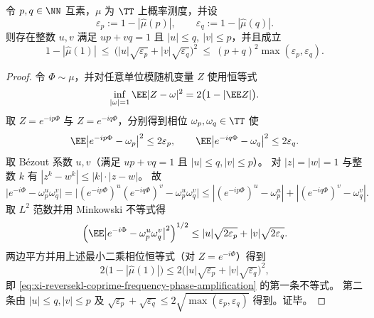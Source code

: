 \begin{proposition}\label{prop:xi-reversekl-coprime-frequency-phase-amplification}
令 \(p,q\in\NN\) 互素，\(\mu\) 为 \(\TT\) 上概率测度，并设
\[
\varepsilon_p:=1-|\widehat\mu(p)|,\qquad \varepsilon_q:=1-|\widehat\mu(q)|.
\]
则存在整数 \(u,v\) 满足 \(up+vq=1\) 且 \(|u|\le q,\ |v|\le p\)，并且成立
\begin{equation}\label{eq:xi-reversekl-coprime-frequency-phase-amplification}
\boxed{\;
1-|\widehat\mu(1)|
\ \le\
\bigl(|u|\sqrt{\varepsilon_p}+|v|\sqrt{\varepsilon_q}\bigr)^2
\ \le\
(p+q)^2\max(\varepsilon_p,\varepsilon_q).\;}
\end{equation}
\end{proposition}
\begin{proof}
令 \(\Phi\sim\mu\)，并对任意单位模随机变量 \(Z\) 使用恒等式
\[
\inf_{|\omega|=1}\EE|Z-\omega|^2
=2\bigl(1-|\EE Z|\bigr).
\]
取 \(Z=e^{-ip\Phi}\) 与 \(Z=e^{-iq\Phi}\)，分别得到相位 \(\omega_p,\omega_q\in\TT\) 使
\[
\EE\bigl|e^{-ip\Phi}-\omega_p\bigr|^2\le 2\varepsilon_p,\qquad
\EE\bigl|e^{-iq\Phi}-\omega_q\bigr|^2\le 2\varepsilon_q.
\]
取 Bézout 系数 \(u,v\)（满足 \(up+vq=1\) 且 \(|u|\le q,|v|\le p\)）。
对 \(|z|=|w|=1\) 与整数 \(k\) 有
\(
|z^k-w^k|\le |k|\cdot |z-w|
\)。
故
\[
\bigl|e^{-i\Phi}-\omega_p^{u}\omega_q^{v}\bigr|
=\bigl|(e^{-ip\Phi})^{u}(e^{-iq\Phi})^{v}-\omega_p^{u}\omega_q^{v}\bigr|
\le |(e^{-ip\Phi})^{u}-\omega_p^{u}|+|(e^{-iq\Phi})^{v}-\omega_q^{v}|.
\]
取 \(L^2\) 范数并用 Minkowski 不等式得
\[
\Bigl(\EE\bigl|e^{-i\Phi}-\omega_p^{u}\omega_q^{v}\bigr|^2\Bigr)^{1/2}
\le |u|\sqrt{2\varepsilon_p}+|v|\sqrt{2\varepsilon_q}.
\]
两边平方并用上述最小二乘相位恒等式（对 \(Z=e^{-i\Phi}\)）得到
\[
2\bigl(1-|\widehat\mu(1)|\bigr)
\le 2\bigl(|u|\sqrt{\varepsilon_p}+|v|\sqrt{\varepsilon_q}\bigr)^2,
\]
即 \eqref{eq:xi-reversekl-coprime-frequency-phase-amplification} 的第一条不等式。
第二条由 \(|u|\le q,|v|\le p\) 及
\(
\sqrt{\varepsilon_p}+\sqrt{\varepsilon_q}\le 2\sqrt{\max(\varepsilon_p,\varepsilon_q)}
\)
得到。证毕。
\end{proof}


